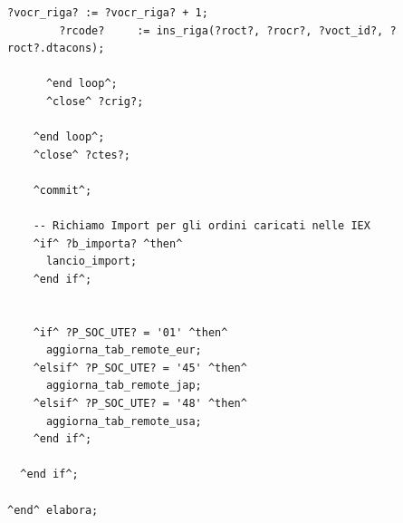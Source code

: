 \begin{lstlisting}[frame=single, style=base]
        ?vocr_riga? := ?vocr_riga? + 1;
        ?rcode?     := ins_riga(?roct?, ?rocr?, ?voct_id?, ?roct?.dtacons);

      ^end loop^;
      ^close^ ?crig?;

    ^end loop^;
    ^close^ ?ctes?;

    ^commit^;

    -- Richiamo Import per gli ordini caricati nelle IEX
    ^if^ ?b_importa? ^then^
      lancio_import;
    ^end if^;


    ^if^ ?P_SOC_UTE? = '01' ^then^
      aggiorna_tab_remote_eur;
    ^elsif^ ?P_SOC_UTE? = '45' ^then^
      aggiorna_tab_remote_jap;
    ^elsif^ ?P_SOC_UTE? = '48' ^then^
      aggiorna_tab_remote_usa;
    ^end if^;

  ^end if^;

^end^ elabora;


\end{lstlisting}

